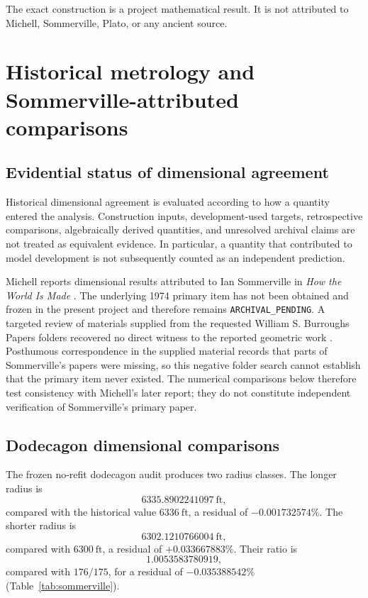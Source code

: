 \documentclass[11pt]{article}
\newcommand{\ArchivePending}{\texttt{ARCHIVAL\_PENDING}}
\begin{document}
The exact construction is a project mathematical result.  It is not
attributed to Michell, Sommerville, Plato, or any ancient source.


\section{Historical metrology and Sommerville-attributed comparisons}

\subsection{Evidential status of dimensional agreement}

Historical dimensional agreement is evaluated according to how a quantity
entered the analysis.  Construction inputs, development-used targets,
retrospective comparisons, algebraically derived quantities, and unresolved
archival claims are not treated as equivalent evidence.  In particular, a
quantity that contributed to model development is not subsequently counted as
an independent prediction.

Michell reports dimensional results attributed to Ian Sommerville in
\emph{How the World Is Made} \citep{michell2009world}.  The underlying 1974
primary item has not been obtained and frozen in the present project and
therefore remains \ArchivePending{}.  A targeted review of materials supplied
from the requested William S. Burroughs Papers folders recovered no direct
witness to the reported geometric work \citep{osuBurroughsPapers2026}.
Posthumous correspondence in the supplied material records that parts of
Sommerville's papers were missing, so this negative folder search cannot
establish that the primary item never existed.  The numerical comparisons
below therefore test consistency with Michell's later report; they do not
constitute independent verification of Sommerville's primary paper.

\subsection{Dodecagon dimensional comparisons}

The frozen no-refit dodecagon audit produces two radius classes.  The longer
radius is
\[
6335.8902241097\ \mathrm{ft},
\]
compared with the historical value $6336\ \mathrm{ft}$, a residual of
$-0.001732574\%$.  The shorter radius is
\[
6302.1210766004\ \mathrm{ft},
\]
compared with $6300\ \mathrm{ft}$, a residual of $+0.033667883\%$.
Their ratio is
\[
1.0053583780919,
\]
compared with $176/175$, for a residual of $-0.035388542\%$
(Table~\ref{tab:sommerville}).
\end{document}

